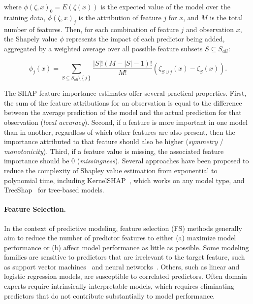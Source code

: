 \documentclass[
  oneside]{book}
\begin{document}
where \(\phi(\zeta,x)_0=E(\zeta(x))\) is the expected value of the model over the training data, \(\phi(\zeta,x)_j\) is the attribution of feature \(j\) for \(x\), and \(M\) is the total number of features.
Then, for each combination of feature \(j\) and observation \(x\), the Shapely value \(\phi\) represents the impact of each predictor being added, aggregated by a weighted average over all possible feature subsets \(S\subseteq S_{all}\):

\begin{equation}
\phi_{j}(x)=\sum_{S\subseteq S_{all}\setminus\left\{j\right\}}\frac{|S|!(M-|S|-1)!}{M!}\left(\zeta_{S\cup{j}}(x)-\zeta_S(x)\right).
\label{eq:shapley}
\end{equation}

The SHAP feature importance estimates offer several practical properties.
First, the sum of the feature attributions for an observation is equal to the difference between the average prediction of the model and the actual prediction for that observation (\emph{local accuracy}).
Second, if a feature is more important in one model than in another, regardless of which other features are also present, then the importance attributed to that feature should also be higher (\emph{symmetry} / \emph{monotonicity}).
Third, if a feature value is missing, the associated feature importance should be 0 (\emph{missingness}).
Several approaches have been proposed to reduce the complexity of Shapley value estimation from exponential to polynomial time, including KernelSHAP~\autocite{Lundberg:SHAP2017}, which works on any model type, and TreeShap~\autocite{Lundberg:TreeSHAP2019} for tree-based models.

\paragraph*{Feature Selection.}

In the context of predictive modeling, feature selection (FS) methods generally aim to reduce the number of predictor features to either (a) maximize model performance or (b) affect model performance as little as possible.
Some modeling families are sensitive to predictors that are irrelevant to the target feature, such as support vector machines~\autocite{Boser:SVM1992} and neural networks~\autocite{nnet,Goodfellow:DL2016}.
Others, such as linear and logistic regression models, are susceptible to correlated predictors.
Often domain experts require intrinsically interpretable models, which requires eliminating predictors that do not contribute substantially to model performance.
\end{document}
